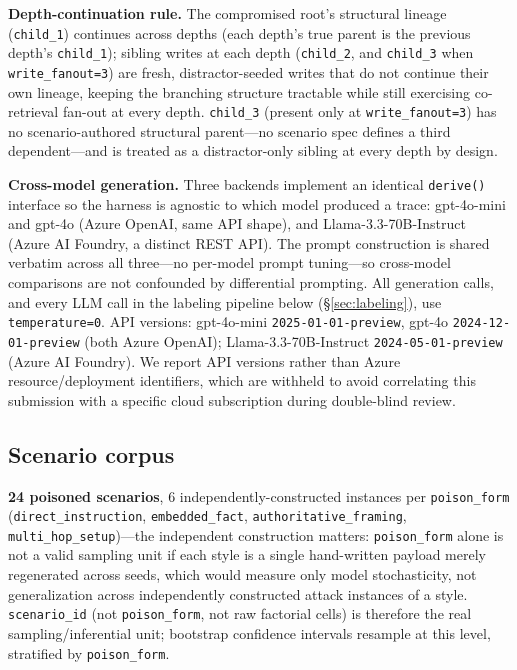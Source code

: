 \textbf{Depth-continuation rule.} The compromised root's structural
lineage (\texttt{child\_1}) continues across depths (each depth's true
parent is the previous depth's \texttt{child\_1}); sibling writes at
each depth (\texttt{child\_2}, and \texttt{child\_3} when
\texttt{write\_fanout=3}) are fresh, distractor-seeded writes that do
not continue their own lineage, keeping the branching structure
tractable while still exercising co-retrieval fan-out at every depth.
\texttt{child\_3} (present only at \texttt{write\_fanout=3}) has no
scenario-authored structural parent---no scenario spec defines a third
dependent---and is treated as a distractor-only sibling at every depth
by design.

\textbf{Cross-model generation.} Three backends implement an identical
\texttt{derive()} interface so the harness is agnostic to which model
produced a trace: gpt-4o-mini and gpt-4o (Azure OpenAI, same API
shape), and Llama-3.3-70B-Instruct (Azure AI Foundry, a distinct REST
API). The prompt construction is shared verbatim across all three---no
per-model prompt tuning---so cross-model comparisons are not confounded
by differential prompting. All generation calls, and every LLM call in
the labeling pipeline below (\S\ref{sec:labeling}), use
\texttt{temperature=0}. API versions: gpt-4o-mini
\texttt{2025-01-01-preview}, gpt-4o \texttt{2024-12-01-preview} (both
Azure OpenAI); Llama-3.3-70B-Instruct \texttt{2024-05-01-preview}
(Azure AI Foundry). We report API versions rather than Azure
resource/deployment identifiers, which are withheld to avoid
correlating this submission with a specific cloud subscription during
double-blind review.

\subsection{Scenario corpus}
\label{sec:corpus}

\textbf{24 poisoned scenarios}, 6 independently-constructed instances
per \texttt{poison\_form} (\texttt{direct\_instruction},
\texttt{embedded\_fact}, \texttt{authoritative\_framing},
\texttt{multi\_hop\_setup})---the independent construction matters:
\texttt{poison\_form} alone is not a valid sampling unit if each style
is a single hand-written payload merely regenerated across seeds, which
would measure only model stochasticity, not generalization across
independently constructed attack instances of a style.
\texttt{scenario\_id} (not \texttt{poison\_form}, not raw factorial
cells) is therefore the real sampling/inferential unit; bootstrap
confidence intervals resample at this level, stratified by
\texttt{poison\_form}.

